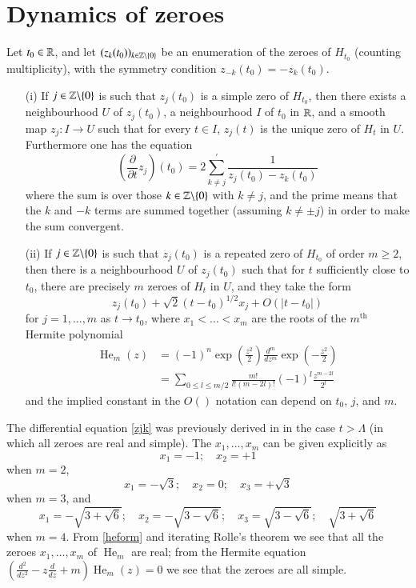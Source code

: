 \section{Dynamics of zeroes}


\begin{proposition}\label{dynam}  Let $t_0 \in \mathbb{R}$, and let $(z_k(t_0))_{k \in \mathbb{Z} \backslash \{0\}}$ be an enumeration of the zeroes of $H_{t_0}$ (counting multiplicity), with the symmetry condition $z_{-k}(t_0) = -z_k(t_0)$.
\begin{itemize}
\item[(i)]  If $j \in \mathbb{Z} \backslash \{0\}$ is such that $z_j(t_0)$ is a simple zero of $H_{t_0}$, then there exists a neighbourhood $U$ of $z_j(t_0)$, a neighbourhood $I$ of $t_0$ in $\mathbb{R}$, and a smooth map $z_j: I \to U$ such that for every $t \in I$, $z_j(t)$ is the unique zero of $H_t$ in $U$.  Furthermore one has the equation
\begin{equation}\label{zjk}
 (\frac{\partial}{\partial t} z_j)(t_0) = 2 \sum^{\prime}_{k \neq j} \frac{1}{z_j(t_0) - z_k(t_0)} 
\end{equation}
where the sum is over those $k \in \mathbb{Z} \backslash \{0\}$ with $k \neq j$, and the prime means that the $k$ and $-k$ terms are summed together (assuming $k \neq \pm j$) in order to make the sum convergent.
\item[(ii)]  If $j \in \mathbb{Z} \backslash \{0\}$ is such that $z_j(t_0)$ is a repeated zero of $H_{t_0}$ of order $m \geq 2$, then there is a neighbourhood $U$ of $z_j(t_0)$ such that for $t$ sufficiently close to $t_0$, there are precisely $m$ zeroes of $H_t$ in $U$, and they take the form
$$ z_j(t_0) + \sqrt{2} (t-t_0)^{1/2} x_j + O( |t-t_0|)$$
for $j=1,\dots,m$ as $t \to t_0$, where $x_1 < \dots < x_m$ are the roots of the $m^{\operatorname{th}}$ Hermite polynomial
\begin{align}
\operatorname{He}_m(z) &= (-1)^n \exp(\frac{z^2}{2}) \frac{d^m}{dz^m} \exp(-\frac{z^2}{2})\label{heform}\\
&= \sum_{0 \leq l \leq m/2} \frac{m!}{l! (m-2l)!} (-1)^l \frac{z^{m-2l}}{2^l}\label{heform2}
\end{align}
and the implied constant in the $O()$ notation can depend on $t_0$, $j$, and $m$.
\end{itemize}
\end{proposition}

The differential equation \eqref{zjk} was previously derived in \cite[Lemma 2.4]{csv} in the case $t > \Lambda$ (in which all zeroes are real and simple).
The $x_1,\dots,x_m$ can be given explicitly as
$$ x_1 = -1; \quad x_2 = +1$$
when $m=2$,
$$ x_1 = -\sqrt{3}; \quad x_2 = 0; \quad x_3 = +\sqrt{3}$$
when $m=3$, and
$$ x_1 = -\sqrt{3+\sqrt{6}}; \quad x_2 = -\sqrt{3-\sqrt{6}}; \quad x_3 = \sqrt{3 - \sqrt{6}}; \quad \sqrt{3 + \sqrt{6}}$$
when $m=4$.  From \eqref{heform} and iterating Rolle's theorem we see that all the zeroes $x_1,\dots,x_m$ of $\operatorname{He}_m$ are real; from the Hermite equation $\left(\frac{d^2}{dz^2} - z \frac{d}{dz} + m\right) \operatorname{He}_m(z) = 0$ we see that the zeroes are all simple.

